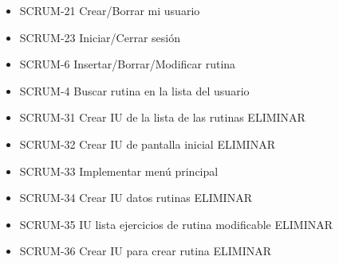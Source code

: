 \begin{itemize}
  \item SCRUM-21 Crear/Borrar mi usuario
  \item SCRUM-23 Iniciar/Cerrar sesión
  \item SCRUM-6 Insertar/Borrar/Modificar rutina
  \item SCRUM-4 Buscar rutina en la lista del usuario
  \item SCRUM-31 Crear IU de la lista de las rutinas ELIMINAR
  \item SCRUM-32 Crear IU de pantalla inicial ELIMINAR
  \item SCRUM-33 Implementar menú principal
  \item SCRUM-34 Crear IU datos rutinas ELIMINAR
  \item SCRUM-35 IU lista ejercicios de rutina modificable ELIMINAR
  \item SCRUM-36 Crear IU para crear rutina ELIMINAR
\end{itemize}

